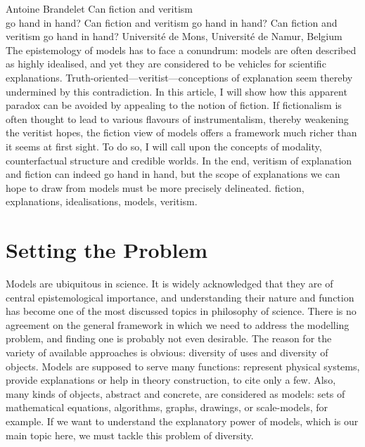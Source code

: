 \begin{artengenv}{Antoine Brandelet}
	{Can fiction and veritism\\go hand in hand?}
	{Can fiction and veritism go hand in hand?}
	{Can fiction and veritism go hand in hand?}
	{Université de Mons, Université de Namur, Belgium}
	{The epistemology of models has to face a conundrum: models are often described as highly idealised, and yet they are considered to be vehicles for scientific explanations. Truth-oriented---veritist---conceptions of explanation seem thereby undermined by this contradiction. In this article, I will show how this apparent paradox can be avoided by appealing to the notion of fiction. If fictionalism is often thought to lead to various flavours of instrumentalism, thereby weakening the veritist hopes, the fiction view of models offers a framework much richer than it seems at first sight. To do so, I will call upon the concepts of modality, counterfactual structure and credible worlds. In the end, veritism of explanation and fiction can indeed go hand in hand, but the scope of explanations we can hope to draw from models must be more precisely delineated.
	}
	{fiction, explanations, idealisations, models, veritism.}



\section{Setting the Problem}


\lettrine[loversize=0.13,lines=2,lraise=-0.03,nindent=0em,findent=0.2pt]%
{M}{}odels are ubiquitous in science. It is widely acknowledged that they are of central epistemological importance, and understanding their nature and function has become one of the most discussed topics in philosophy of science. There is no agreement on the general framework in which we need to address the modelling problem, and finding one is probably not even desirable. The reason for the variety of available approaches is obvious: diversity of uses and diversity of objects. Models are supposed to serve many functions: represent physical systems, provide explanations or help in theory construction, to cite only a few. Also, many kinds of objects, abstract and concrete, are considered as models: sets of mathematical equations, algorithms, graphs, drawings, or scale-models, for example. If we want to understand the explanatory power of models, which is our main topic here, we must tackle this problem of diversity.


\end{artengenv}
